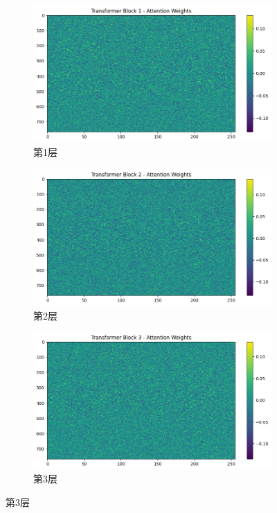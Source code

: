 \begin{figure}[H]
    \centering
    \begin{subfigure}{0.3\textwidth}
        \includegraphics[width=\linewidth]{../output/transformer/no scheduler/Transformer Block 1 Attention Weights.png}
        \caption{第1层}
        \label{fig:transformerblock1attentionweightsnoscheduler}
    \end{subfigure}
    \hfill
    \begin{subfigure}{0.3\textwidth}
        \includegraphics[width=\linewidth]{../output/transformer/no scheduler/Transformer Block 2 Attention Weights.png}
        \caption{第2层}
        \label{fig:transformerblock2attentionweightsnoscheduler}
    \end{subfigure}
    \hfill
    \begin{subfigure}{0.3\textwidth}
        \includegraphics[width=\linewidth]{../output/transformer/no scheduler/Transformer Block 3 Attention Weights.png}
        \caption{第3层}
        \label{fig:transformerblock3attentionweightsnoscheduler}
    \end{subfigure}


\end{figure}
